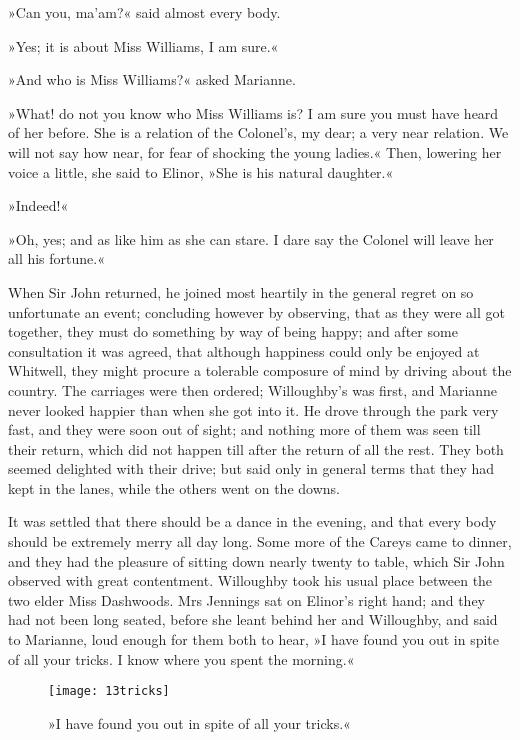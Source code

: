 »Can you, ma’am?« said almost every body.

»Yes; it is about Miss Williams, I am sure.«

»And who is Miss Williams?« asked Marianne.

»What! do not you know who Miss Williams is? I am sure you must have heard of her before. She is a relation of the Colonel’s, my dear; a very near relation. We will not say how near, for fear of shocking the young ladies.« Then, lowering her voice a little, she said to Elinor, »She is his natural daughter.«

»Indeed!«

»Oh, yes; and as like him as she can stare. I dare say the Colonel will leave her all his fortune.«

When Sir John returned, he joined most heartily in the general regret on so unfortunate an event; concluding however by observing, that as they were all got together, they must do something by way of being happy; and after some consultation it was agreed, that although happiness could only be enjoyed at Whitwell, they might procure a tolerable composure of mind by driving about the country. The carriages were then ordered; Willoughby’s was first, and Marianne never looked happier than when she got into it. He drove through the park very fast, and they were soon out of sight; and nothing more of them was seen till their return, which did not happen till after the return of all the rest. They both seemed delighted with their drive; but said only in general terms that they had kept in the lanes, while the others went on the downs.

It was settled that there should be a dance in the evening, and that every body should be extremely merry all day long. Some more of the Careys came to dinner, and they had the pleasure of sitting down nearly twenty to table, which Sir John observed with great contentment. Willoughby took his usual place between the two elder Miss Dashwoods. Mrs Jennings sat on Elinor’s right hand; and they had not been long seated, before she leant behind her and Willoughby, and said to Marianne, loud enough for them both to hear, »I have found you out in spite of all your tricks. I know where you spent the morning.«

\begin{figure}[tbph]
\centering
\texttt{[image: 13tricks]}
\caption{»I have found you out in spite of all your tricks.«}
\end{figure}

